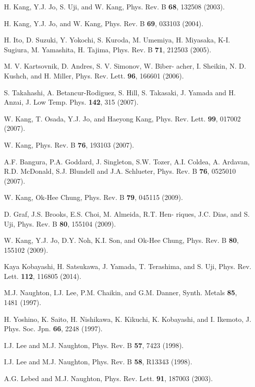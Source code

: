 \documentclass[prl,aps,showpacs,twocolumn,floatfix]{revtex4}
\begin{document}
\begin{references}
H. Kang, Y.J. Jo, S. Uji, and W. Kang, Phys. Rev. B \textbf{68},
132508 (2003).

H. Kang, Y.J. Jo, and W. Kang, Phys. Rev. B \textbf{69}, 033103
(2004).

H. Ito, D. Suzuki, Y. Yokochi, S. Kuroda, M. Umemiya, H. Miyasaka,
K-I. Sugiura, M. Yamashita, H. Tajima, Phys. Rev. B \textbf{71},
212503 (2005).

M. V. Kartsovnik, D. Andres, S. V. Simonov, W. Biber- acher, I.
Sheikin, N. D. Kushch, and H. Miller, Phys. Rev. Lett.
\textbf{96}, 166601 (2006).

S. Takahashi, A. Betancur-Rodiguez, S. Hill, S. Takasaki, J.
Yamada and H. Anzai, J. Low Temp. Phys. \textbf{142}, 315 (2007).

W. Kang, T. Osada, Y.J. Jo, and Haeyong Kang, Phys. Rev. Lett.
\textbf{99}, 017002 (2007).

W. Kang, Phys. Rev. B \textbf{76}, 193103 (2007).

A.F. Bangura, P.A. Goddard, J. Singleton, S.W. Tozer, A.I. Coldea,
A. Ardavan, R.D. McDonald, S.J. Blundell and J.A. Schlueter, Phys.
Rev. B \textbf{76}, 0525010 (2007).

W. Kang, Ok-Hee Chung, Phys. Rev. B \textbf{79}, 045115 (2009).

D. Graf, J.S. Brooks, E.S. Choi, M. Almeida, R.T. Hen- riques,
J.C. Dias, and S. Uji, Phys. Rev. B \textbf{80}, 155104 (2009).

W. Kang, Y.J. Jo, D.Y. Noh, K.I. Son, and Ok-Hee Chung, Phys. Rev.
B \textbf{80}, 155102 (2009).

Kaya Kobayashi, H. Satsukawa, J. Yamada, T. Terashima, and S. Uji,
Phys. Rev. Lett. \textbf{112}, 116805 (2014).


M.J. Naughton, I.J. Lee, P.M. Chaikin, and G.M. Danner, Synth.
Metals \textbf{85}, 1481 (1997).

H. Yoshino, K. Saito, H. Nishikawa, K. Kikuchi, K. Kobayashi, and
I. Ikemoto, J. Phys. Soc. Jpn. \textbf{66}, 2248 (1997).

I.J. Lee and M.J. Naughton, Phys. Rev. B \textbf{57}, 7423 (1998).

I.J. Lee and M.J. Naughton, Phys. Rev. B \textbf{58}, R13343
(1998).

A.G. Lebed and M.J. Naughton, Phys. Rev. Lett. \textbf {91},
187003 (2003).


\end{references}
\end{document}
